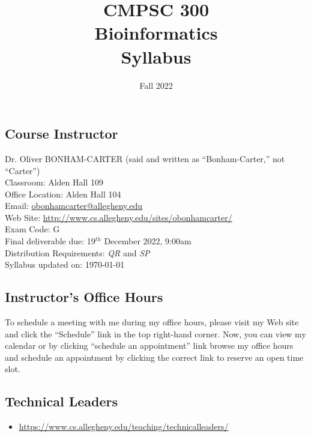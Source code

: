 \documentclass[11pt]{article} %
\title{\textbf{CMPSC 300\\ Bioinformatics\\ Syllabus}}
\author{Fall 2022}
\date{} %
\begin{document}
\maketitle

\subsection*{\textbf{Course Instructor}}
Dr. Oliver BONHAM-CARTER (said and written as ``Bonham-Carter,'' not “Carter'')\\
\noindent Classroom: Alden Hall 109 \\
\noindent Office Location: Alden Hall 104 \\
\noindent Email: \url{obonhamcarter@allegheny.edu} \\
\noindent Web Site: \url{http://www.cs.allegheny.edu/sites/obonhamcarter/} \\
\noindent Exam Code: G\\
\noindent Final deliverable due: 19$^{th}$ December 2022, 9:00am\\
\noindent Distribution Requirements: \emph{QR} and \emph{SP}\\
\noindent Syllabus updated on: \today\\

\subsection*{\textbf{Instructor's Office Hours}}


\noindent
To schedule a meeting with me during my office hours, please visit my Web site and click the ``Schedule'' link in the top right-hand corner. Now, you can view my calendar or by clicking ``schedule an appointment'' link browse my office hours and schedule an appointment by clicking the correct link to reserve an open time slot. 



\subsection*{\textbf{Technical Leaders}}
	\begin{itemize}
		\item   \url{https://www.cs.allegheny.edu/teaching/technicalleaders/}
	\end{itemize}
\end{document}

